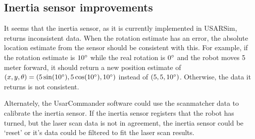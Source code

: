 \subsection{Inertia sensor improvements}
\label{inertia}
It seems that the inertia sensor, as it is currently implemented in USARSim, returns inconsistent data. When the rotation estimate has an error, the absolute location estimate from the sensor should be consistent with this. For example, if the rotation estimate is $10\degree$ while the real rotation is $0\degree$ and the robot moves 5 meter forward, it should return a new position estimate of $(x, y, \theta) = (5 \sin(10\degree), 5 \cos(10\degree), 10\degree)$ instead of $(5, 5, 10\degree)$. Otherwise, the data it returns is not consistent.

Alternately, the UsarCommander software could use the scanmatcher data to calibrate the inertia sensor. If the inertia sensor registers that the robot has turned, but the laser scan data is not in agreement, the inertia sensor could be `reset' or it's data could be filtered to fit the laser scan results.
